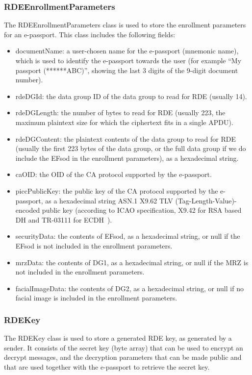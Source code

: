 \subsubsection{\textsf{RDEEnrollmentParameters}}\label{subsubsec:rdeenrollmentparameters}
The \textsf{RDEEnrollmentParameters} class is used to store the enrollment parameters for an e-passport.
This class includes the following fields:
\begin{itemize}
    \item \textsf{documentName}: a user-chosen name for the e-passport (mnemonic name), which is used to identify the e-passport towards the user (for example ``\textsf{My passport (******ABC)}'', showing the last 3 digits of the 9-digit document number).
    \item \textsf{rdeDGId}: the data group ID of the data group to read for RDE (usually 14).
    \item \textsf{rdeDGLength}: the number of bytes to read for RDE (usually 223, the maximum plaintext size for which the ciphertext fits in a single APDU).
    \item \textsf{rdeDGContent}: the plaintext contents of the data group to read for RDE (usually the first 223 bytes of the data group, or the full data group if we do include the EFsod in the enrollment parameters), as a hexadecimal string.
    \item \textsf{caOID}: the OID of the CA protocol supported by the e-passport.
    \item \textsf{piccPublicKey}: the public key of the CA protocol supported by the e-passport, as a hexadecimal string ASN.1 X9.62 TLV (Tag-Length-Value)-encoded public key (according to ICAO specification, X9.42 for RSA based DH and TR-03111 for ECDH~\cite{icao9303securitymechanisms}).
    \item \textsf{securityData}: the contents of EFsod, as a hexadecimal string, or null if the EFsod is not included in the enrollment parameters.
    \item \textsf{mrzData}: the contents of DG1, as a hexadecimal string, or null if the MRZ is not included in the enrollment parameters.
    \item \textsf{facialImageData}: the contents of DG2, as a hexadecimal string, or null if no facial image is included in the enrollment parameters.
\end{itemize}

\subsubsection{\textsf{RDEKey}}\label{subsubsec:rdekey}
The \textsf{RDEKey} class is used to store a generated RDE key, as generated by a sender.
It consists of the secret key (byte array) that can be used to encrypt an decrypt messages, and the decryption parameters that can be made public and that are used together with the e-passport to retrieve the secret key.

